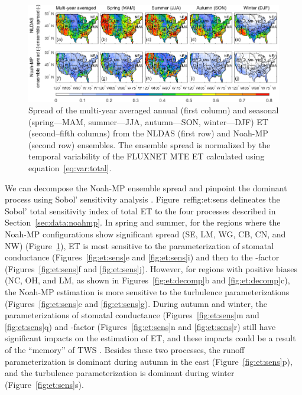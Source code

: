\documentclass[essd, manuscript]{copernicus}
\begin{document}
\begin{figure}[t]
  \includegraphics[width=12cm]{fig/fig13.pdf}
  \caption{Spread of the multi-year averaged annual (first column) and seasonal (spring---MAM, summer---JJA, autumn---SON, winter---DJF) ET (second--fifth columns) from the NLDAS (first row) and Noah-MP (second row) ensembles. The ensemble spread is normalized by the temporal variability of the FLUXNET MTE ET calculated using equation~\eqref{eq:var:total}.}
  \label{fig:et:spread}
\end{figure}

We can decompose the Noah-MP ensemble spread and pinpoint the dominant process using Sobol' sensitivity analysis \citep{zheng2019WRR}. Figure~ref{fig:et:sens} delineates the Sobol' total sensitivity index of total ET to the four processes described in Section~\ref{sec:data:noahmp}. In spring and summer, for the regions where the Noah-MP configurations show significant spread (SE, LM, WG, CB, CN, and NW) (Figure~\ref{fig:et:spread}), ET is most sensitive to the parameterization of stomatal conductance (Figures~\ref{fig:et:sens}e and \ref{fig:et:sens}i) and then to the \beta{}-factor (Figures~\ref{fig:et:sens}f and \ref{fig:et:sens}j). However, for regions with positive biases (NC, OH, and LM, as shown in Figures~\ref{fig:et:decomp}b and \ref{fig:et:decomp}c), the Noah-MP estimation is more sensitive to the turbulence parameterizations (Figures~\ref{fig:et:sens}c and \ref{fig:et:sens}g). During autumn and winter, the parameterizations of stomatal conductance (Figures~\ref{fig:et:sens}m and \ref{fig:et:sens}q) and \beta{}-factor (Figures~\ref{fig:et:sens}n and \ref{fig:et:sens}r) still have significant impacts on the estimation of ET, and these impacts could be a result of the ``memory'' of TWS \citep{zheng2019WRR}. Besides these two processes, the runoff parameterization is dominant during autumn in the east (Figure~\ref{fig:et:sens}p), and the turbulence parameterization is dominant during winter (Figure~\ref{fig:et:sens}s).
\end{document}
